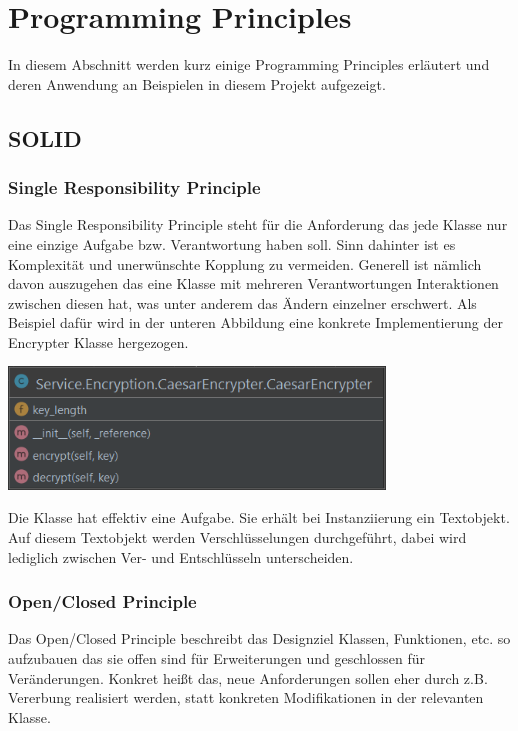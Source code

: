 \documentclass[12pt]{article}
\begin{document}
\newpage

\section{Programming Principles}
In diesem Abschnitt werden kurz einige Programming Principles erläutert und deren Anwendung an Beispielen in diesem Projekt aufgezeigt.

\subsection{SOLID}
\subsubsection{Single Responsibility Principle}
Das Single Responsibility Principle steht für die Anforderung das jede Klasse nur eine einzige Aufgabe bzw. Verantwortung haben soll. Sinn dahinter ist es Komplexität und unerwünschte Kopplung zu vermeiden. Generell ist nämlich davon auszugehen das eine Klasse mit mehreren Verantwortungen Interaktionen zwischen diesen hat, was unter anderem das Ändern einzelner erschwert.
Als Beispiel dafür wird in der unteren Abbildung eine konkrete Implementierung der Encrypter Klasse hergezogen.
\begin{center}
	\includegraphics[width=10cm]{bilder/SRP.png}
\end{center}
Die Klasse hat effektiv eine Aufgabe. Sie erhält bei Instanziierung ein Textobjekt. Auf diesem Textobjekt werden Verschlüsselungen durchgeführt, dabei wird lediglich zwischen Ver- und Entschlüsseln unterscheiden.

\subsubsection{Open/Closed Principle}
Das Open/Closed Principle beschreibt das Designziel Klassen, Funktionen, etc. so aufzubauen das sie offen sind für Erweiterungen und geschlossen für Veränderungen. Konkret heißt das, neue Anforderungen sollen eher durch z.B. Vererbung realisiert werden, statt konkreten Modifikationen in der relevanten Klasse.
\end{document}
